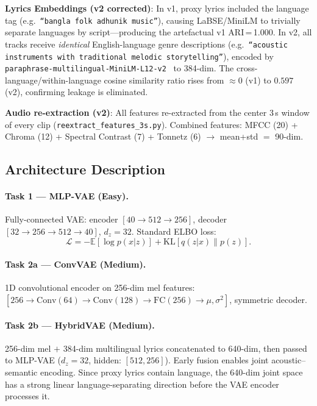 \documentclass{article}
\begin{document}
\textbf{Lyrics Embeddings (v2 corrected)}: In v1, proxy lyrics included the language
tag (e.g.\ \texttt{``bangla folk adhunik music''}), causing LaBSE/MiniLM to trivially
separate languages by script---producing the artefactual v1 ARI\,=\,1.000. In v2,
all tracks receive \emph{identical} English-language genre descriptions (e.g.\
\texttt{``acoustic instruments with traditional melodic storytelling''}), encoded by
\texttt{paraphrase-multilingual-MiniLM-L12-v2}~\cite{reimers2019sentence} to 384-dim.
The cross-language/within-language cosine similarity ratio rises from $\approx\!0$ (v1)
to $0.597$ (v2), confirming leakage is eliminated.

\textbf{Audio re-extraction (v2)}: All features re-extracted from the center 3\,s window
of every clip (\texttt{reextract\_features\_3s.py}). Combined features: MFCC (20) +
Chroma (12) + Spectral Contrast (7) + Tonnetz (6) $\to$ mean+std $=$ 90-dim.

\subsection{Architecture Description}

\paragraph{Task 1 --- MLP-VAE (Easy).}
Fully-connected VAE: encoder $[40\!\to\!512\!\to\!256]$, decoder
$[32\!\to\!256\!\to\!512\!\to\!40]$, $d_z\!=\!32$. Standard ELBO loss:
\[
\mathcal{L} = -\mathbb{E}[\log p(x|z)] + \text{KL}[q(z|x) \| p(z)].
\]

\paragraph{Task 2a --- ConvVAE (Medium).}
1D convolutional encoder on 256-dim mel features:
$[256 \to \text{Conv}(64) \to \text{Conv}(128) \to \text{FC}(256) \to \mu, \sigma^2]$,
symmetric decoder.

\paragraph{Task 2b --- HybridVAE (Medium).}
256-dim mel $+$ 384-dim multilingual lyrics concatenated to 640-dim, then passed to
MLP-VAE ($d_z\!=\!32$, hidden: $[512, 256]$). Early fusion enables joint acoustic--semantic
encoding. Since proxy lyrics contain language, the 640-dim joint space has a strong
linear language-separating direction before the VAE encoder processes it.
\end{document}
